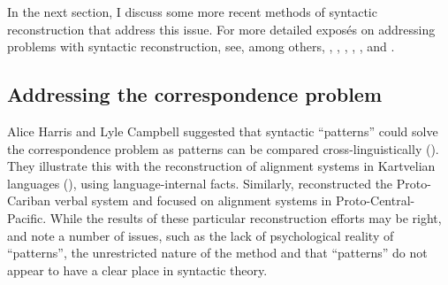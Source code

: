 \documentclass[output=paper,colorlinks,citecolor=brown]{langscibook}
\begin{document}
In the next section, I discuss some more recent methods of syntactic reconstruction that address this issue. For more detailed exposés on addressing problems with syntactic reconstruction, see, among others, \citet{mm:bowern_syntactic_2008}, \citet{mm:willis_reconstructing_2011}, \citet{mm:Walkden2014}, \citet{mm:viti_historical_2015}, \citet{mm:clackson2017}, and \citet{mm:gildea_curious_2020}.

\subsection{Addressing the correspondence problem}

Alice Harris and Lyle Campbell suggested that syntactic “patterns” could solve the correspondence problem as patterns can be compared cross-linguistically (\cite{mm:campbell_syntactic_2002}). They illustrate this with the reconstruction of alignment systems in Kartvelian languages  (\cite{mm:harris_reconstruction_2008}), using language-internal facts. Similarly, \citet{mm:gildea_genesis_2000} reconstructed the Proto-Cariban verbal system and \citet{mm:kikusawa_proto_2002} focused on alignment systems in Proto-Central-Pacific. While the results of these particular reconstruction efforts may be right, \citet{mm:willis_reconstructing_2011} and \citet{mm:Walkden2014} note a number of issues, such as the lack of psychological reality of “patterns”, the unrestricted nature of the method and that “patterns” do not appear to have a clear place in syntactic theory.
\end{document}
